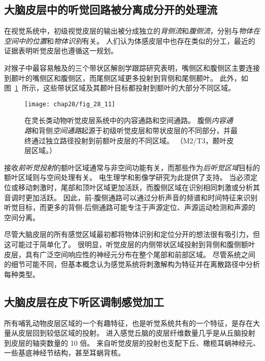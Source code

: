 \subsection{大脑皮层中的听觉回路被分离成分开的处理流}

在视觉系统中，初级视觉皮层的输出被分成独立的\textit{背侧流}和\textit{腹侧流}，分别与\textit{物体在空间中的位置}和\textit{物体识别}有关。
人们认为体感皮层中也存在类似的分工，最近的证据表明听觉皮层也遵循这一规划。


对猴子中最容易触及的三个带状区解剖学跟踪研究表明，嘴侧区和腹侧区主要连接到颞叶的嘴侧区和腹侧区，而尾侧区域更多投射到背侧和尾侧颞叶。
此外，如图~\ref{fig:28_11}~所示，这些带状区域及其颞叶目标都投射到额叶的大部分不同区域。


\begin{figure}[htbp]
	\centering
	\texttt{[image: chap28/fig\_28\_11]}
	\caption{在灵长类动物听觉皮层系统中的内容通路和空间通路。
		腹侧\textit{内容通路}和背侧\textit{空间通路}起源于初级听觉皮层和带状皮层的不同部分，并最终通过独立路径投射到前额叶皮层的不同区域\cite{rauschecker2000mechanisms}。
		（M2/T3，颞叶皮层区域。）}
	\label{fig:28_11}
\end{figure}


接收\textit{前听觉投射}的额叶区域通常与非空间功能有关，而那些作为\textit{后听觉区域}目标的额叶区域则与空间处理有关。
电生理学和影像学研究为此提供了支持。
当必须定位或移动刺激时，尾部和顶叶区域更加活跃，而腹侧区域在识别相同刺激或分析其音调时更加活跃。
因此，前-腹侧通路可以通过分析声音的频谱和时间特征来识别听觉目标，而更多的背侧-后侧通路可能专注于声源定位、声源运动检测和声源的空间分离。


尽管大脑皮层的所有感觉区域最初都将物体识别和定位分开的想法很有吸引力，但这可能过于简单化了。
很明显，听觉皮层的内侧带状区域投射到背侧和腹侧额叶皮层，具有广泛空间响应性的神经元分布在整个尾部和前部区域。
尽管系统之间的细节可能不同，但基本概念认为感觉系统将刺激解构为特征并在离散路径中分析每种类型。



\subsection{大脑皮层在皮下听区调制感觉加工}

所有哺乳动物皮层区域的一个有趣特征，也是听觉系统共有的一个特征，是存在大量从皮层回到较低区域的投射。
进入感觉丘脑的皮层纤维数量几乎是从丘脑投射到皮层的轴突数量的 10 倍。
来自听觉皮层的投射也支配下丘、橄榄耳蜗神经元、一些基底神经节结构，甚至耳蜗背核。


